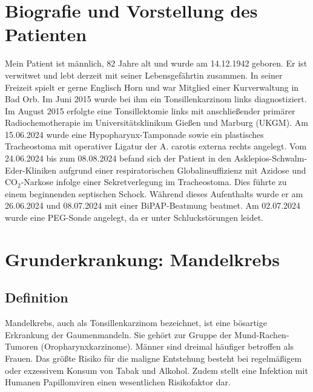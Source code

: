 \documentclass[a4paper,12pt]{article}
\begin{document}
\section{Biografie und Vorstellung des Patienten}
Mein Patient ist männlich, 82 Jahre alt und wurde am 14.12.1942 geboren. Er ist
verwitwet und lebt derzeit mit seiner Lebensgefährtin zusammen. In seiner
Freizeit spielt er gerne Englisch Horn und war Mitglied einer Kurverwaltung in
Bad Orb.
Im Juni 2015 wurde bei ihm ein Tonsillenkarzinom links diagnostiziert. Im
August 2015 erfolgte eine Tonsillektomie links mit anschließender primärer
Radiochemotherapie im Universitätsklinikum Gießen und Marburg (UKGM).
Am 15.06.2024 wurde eine Hypopharynx-Tamponade sowie ein plastisches
Tracheostoma mit operativer Ligatur der A. carotis externa rechts angelegt.
Vom 24.06.2024 bis zum 08.08.2024 befand sich der Patient in den
Asklepios-Schwalm-Eder-Kliniken aufgrund einer respiratorischen
Globalinsuffizienz mit Azidose und CO$_2$-Narkose infolge einer
Sekretverlegung im Tracheostoma. Dies führte zu einem beginnenden septischen
Schock. Während dieses Aufenthalts wurde er am 26.06.2024 und 08.07.2024 mit
einer BiPAP-Beatmung beatmet. Am 02.07.2024 wurde eine PEG-Sonde angelegt,
da er unter Schluckstörungen leidet.

%

\section{Grunderkrankung: Mandelkrebs}

\subsection{Definition}
Mandelkrebs, auch als Tonsillenkarzinom bezeichnet, ist eine bösartige
Erkrankung der Gaumenmandeln. Sie gehört zur Gruppe der Mund-Rachen-Tumoren
(Oropharynxkarzinome). Männer sind dreimal häufiger betroffen als Frauen.
Das größte Risiko für die maligne Entstehung besteht bei regelmäßigem oder
exzessivem Konsum von Tabak und Alkohol. Zudem stellt eine Infektion mit
Humanen Papillomviren einen wesentlichen Risikofaktor dar.
\end{document}
